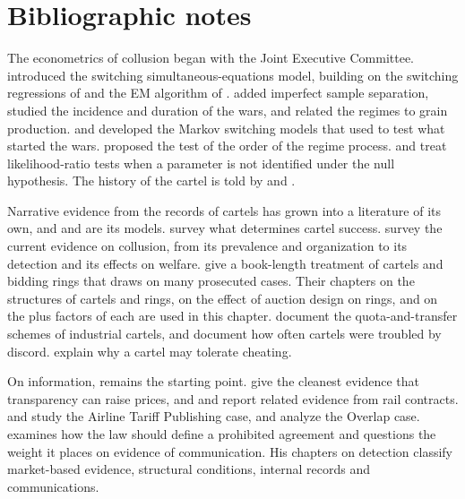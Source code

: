 





\section{Bibliographic notes}\label{sec:13-bibnotes}

The econometrics of collusion began with the Joint Executive Committee. \citet{Porter1983} introduced the switching
simultaneous-equations model, building on the switching regressions of \citet{Kiefer1980} and the EM algorithm of
\citet{DempsterLairdRubin1977}. \citet{LeePorter1984} added imperfect sample separation, \citet{Porter1985} studied
the incidence and duration of the wars, and \citet{Hajivassiliou1989} related the regimes to grain production.
\citet{CosslettLee1985} and \citet{Hamilton1989} developed the Markov switching models that \citet{Ellison1994} used
to test what started the wars. \citet{BerryBriggs1988} proposed the test of the order of the regime process.
\citet{Davies1987} and \citet{Hansen1992} treat likelihood-ratio tests when a parameter is not identified under the
null hypothesis. The history of the cartel is told by \citet{MacAvoy1965} and \citet{Ulen1979}.

Narrative evidence from the records of cartels has grown into a literature of its own, and
\citet{GenesoveMullin2001} and \citet{Levenstein1997} are its models. \citet{LevensteinSuslow2006} survey what
determines cartel success. \citet{AskerNocke2021} survey the current evidence on collusion, from its prevalence and
organization to its detection and its effects on welfare. \citet{MarshallMarx2012} give a book-length treatment of
cartels and bidding rings that draws on many prosecuted cases. Their chapters on the structures of cartels and
rings, on the effect of auction design on rings, and on the plus factors of each are used in this chapter.
\citet{HarringtonSkrzypacz2011} document the quota-and-transfer schemes of industrial cartels, and
\citet{MarshallMarxSamkharadze2013} document how often cartels were troubled by discord. \citet{BernheimMadsen2017}
explain why a cartel may tolerate cheating.

On information, \citet{Stigler1964} remains the starting point. \citet{AlbaekMollgaardOvergaard1997} give the
cleanest evidence that transparency can raise prices, and \citet{FullerRuppelBessler1990} and
\citet{SchmitzFuller1995} report related evidence from rail contracts. \citet{Borenstein2004} and \citet{Miller2010}
study the Airline Tariff Publishing case, and \citet{CarltonBambergerEpstein1995} analyze the Overlap case.
\citet{Kaplow2013} examines how the law should define a prohibited agreement and questions the weight it places on
evidence of communication. His chapters on detection classify market-based evidence, structural conditions,
internal records and communications.

